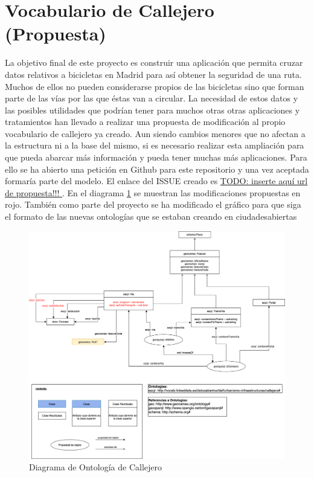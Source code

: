 \section{Vocabulario de Callejero (Propuesta)}

La objetivo final de este proyecto es construir una aplicación que permita cruzar datos relativos a bicicletas en Madrid para así obtener la seguridad de una ruta. Muchos de ellos no pueden considerarse propios de las bicicletas sino que forman parte de las vías por las que éstas van a circular. La necesidad de estos datos y las posibles utilidades que podrían tener para muchos otras otras aplicaciones y tratamientos han llevado a realizar una propuesta de modificación al propio vocabulario de callejero ya creado.\newline
Aun siendo cambios menores que no afectan a la estructura ni a la base del mismo, si es necesario realizar esta ampliación para que pueda abarcar más información y pueda tener muchas más aplicaciones.\newline
Para ello se ha abierto una petición en Github para este repositorio y una vez aceptada formaría parte del modelo. El enlace del ISSUE creado es \url{TODO: inserte aquí url de propuesta!!! }.
\newline
\newline
En el diagrama \ref{fig:diagramaOntologCicloCarr} se muestran las modificaciones propuestas en rojo. También como parte del proyecto se ha modificado el gráfico para que siga el formato de las nuevas ontologías que se estaban creando en ciudadesabiertas \cite{ciudadesabiertas_catalogoVocabs}

\begin{figure}[h]
	\centering
		\includegraphics[angle=0, width=1\textwidth]{images/diagramaCallejero.png}  
	\caption{Diagrama de Ontología de Callejero}
	\label{fig:diagramaOntologCicloCarr}
\end{figure}


